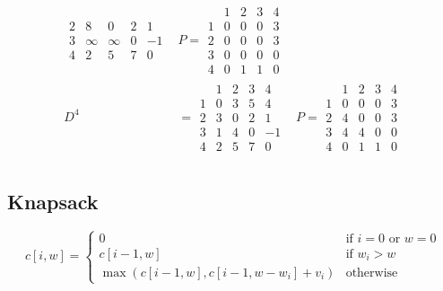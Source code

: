 \documentclass{article}
\begin{document}
\begin{multicols*}{2}
\begin{align*}
\begin{array}{c|cccc}
                    2 & 8      & 0      & 2 & 1  \\
                    3 & \infty & \infty & 0 & -1 \\
                    4 & 2      & 5      & 7 & 0
                \end{array}
            & P = \begin{array}{c|cccc}
                        & 1 & 2 & 3 & 4 \\
                      \hline
                      1 & 0 & 0 & 0 & 3 \\
                      2 & 0 & 0 & 0 & 3 \\
                      3 & 0 & 0 & 0 & 0 \\
                      4 & 0 & 1 & 1 & 0
                  \end{array}                \\
        D^4 & = \begin{array}{c|cccc}
                      & 1 & 2 & 3 & 4  \\
                    \hline
                    1 & 0 & 3 & 5 & 4  \\
                    2 & 3 & 0 & 2 & 1  \\
                    3 & 1 & 4 & 0 & -1 \\
                    4 & 2 & 5 & 7 & 0
                \end{array}
            & P = \begin{array}{c|cccc}
                        & 1 & 2 & 3 & 4 \\
                      \hline
                      1 & 0 & 0 & 0 & 3 \\
                      2 & 4 & 0 & 0 & 3 \\
                      3 & 4 & 4 & 0 & 0 \\
                      4 & 0 & 1 & 1 & 0
                  \end{array}                \\
    \end{align*}

    \subsection*{Knapsack}
    \begin{equation*}
        c[i, w] = \begin{cases}
            0                                    & \text{if } i = 0 \text{ or } w = 0 \\
            c[i-1, w]                            & \text{if } w_i > w                 \\
            \max(c[i-1, w], c[i-1, w-w_i] + v_i) & \text{otherwise}
        \end{cases}
    \end{equation*}


\end{multicols*}
\end{document}
